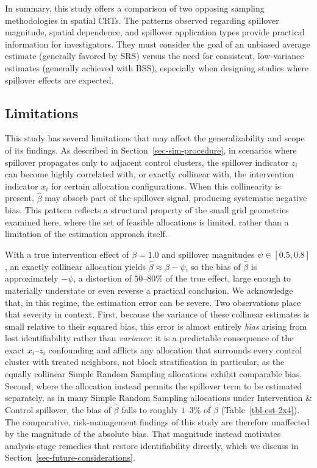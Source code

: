 \documentclass[
  12pt,
  prelim]{bios-prelim}
\begin{document}
In summary, this study offers a comparison of two opposing sampling
methodologies in spatial CRTs. The patterns observed regarding spillover
magnitude, spatial dependence, and spillover application types provide
practical information for investigators. They must consider the goal of
an unbiased average estimate (generally favored by SRS) versus the need
for consistent, low-variance estimates (generally achieved with BSS),
especially when designing studies where spillover effects are expected.

\subsection{Limitations}\label{sec-limitations}

This study has several limitations that may affect the generalizability
and scope of its findings. As described in
Section~\ref{sec-sim-procedure}, in scenarios where spillover propagates
only to adjacent control clusters, the spillover indicator \(z_i\) can
become highly correlated with, or exactly collinear with, the
intervention indicator \(x_i\) for certain allocation configurations.
When this collinearity is present, \(\hat{\beta}\) may absorb part of
the spillover signal, producing systematic negative bias. This pattern
reflects a structural property of the small grid geometries examined
here, where the set of feasible allocations is limited, rather than a
limitation of the estimation approach itself.

With a true intervention effect of \(\beta = 1.0\) and spillover
magnitudes \(\psi \in
[0.5, 0.8]\), an exactly collinear allocation yields
\(\hat{\beta} \approx
\beta - \psi\), so the bias of \(\hat{\beta}\) is approximately
\(-\psi\), a distortion of \(50\)--\(80\%\) of the true effect, large
enough to materially understate or even reverse a practical conclusion.
We acknowledge that, in this regime, the estimation error can be severe.
Two observations place that severity in context. First, because the
variance of these collinear estimates is small relative to their squared
bias, this error is almost entirely \emph{bias} arising from lost
identifiability rather than \emph{variance}: it is a predictable
consequence of the exact \(x_i\)--\(z_i\) confounding and afflicts any
allocation that surrounds every control cluster with treated neighbors,
not block stratification in particular, as the equally collinear Simple
Random Sampling allocations exhibit comparable bias. Second, where the
allocation instead permits the spillover term to be estimated
separately, as in many Simple Random Sampling allocations under
Intervention \& Control spillover, the bias of \(\hat{\beta}\) falls to
roughly \(1\)--\(3\%\) of \(\beta\) (Table~\ref{tbl-est-2x4}). The
comparative, risk-management findings of this study are therefore
unaffected by the magnitude of the absolute bias. That magnitude instead
motivates analysis-stage remedies that restore identifiability directly,
which we discuss in Section~\ref{sec-future-considerations}.
\end{document}
